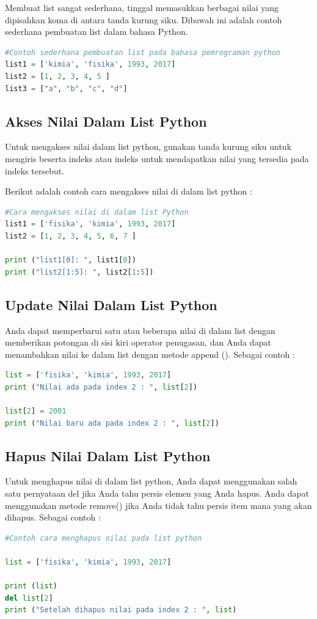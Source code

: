 Membuat list sangat sederhana, tinggal memasukkan berbagai nilai yang dipisahkan koma di antara tanda kurung siku. Dibawah ini adalah contoh sederhana pembuatan list dalam bahasa Python.
\begin{lstlisting}[language=Python]
#Contoh sederhana pembuatan list pada bahasa pemrograman python
list1 = ['kimia', 'fisika', 1993, 2017]
list2 = [1, 2, 3, 4, 5 ]
list3 = ["a", "b", "c", "d"]
\end{lstlisting}

\subsection{Akses Nilai Dalam List Python}
Untuk mengakses nilai dalam list python, gunakan tanda kurung siku untuk mengiris beserta indeks atau indeks untuk mendapatkan nilai yang tersedia pada indeks tersebut.

Berikut adalah contoh cara mengakses nilai di dalam list python :
\begin{lstlisting}[language=Python]
#Cara mengakses nilai di dalam list Python
list1 = ['fisika', 'kimia', 1993, 2017]
list2 = [1, 2, 3, 4, 5, 6, 7 ]

print ("list1[0]: ", list1[0])
print ("list2[1:5]: ", list2[1:5])
\end{lstlisting}

\subsection{Update Nilai Dalam List Python}
Anda dapat memperbarui satu atau beberapa nilai di dalam list dengan memberikan potongan di sisi kiri operator penugasan, dan Anda dapat menambahkan nilai ke dalam list dengan metode append (). Sebagai contoh :
\begin{lstlisting}[language=Python]
list = ['fisika', 'kimia', 1993, 2017]
print ("Nilai ada pada index 2 : ", list[2])

list[2] = 2001
print ("Nilai baru ada pada index 2 : ", list[2])
\end{lstlisting}

\subsection{Hapus Nilai Dalam List Python}
Untuk menghapus nilai di dalam list python, Anda dapat menggunakan salah satu pernyataan del jika Anda tahu persis elemen yang Anda hapus. Anda dapat menggunakan metode remove() jika Anda tidak tahu persis item mana yang akan dihapus. Sebagai contoh :
\begin{lstlisting}[language=Python]
#Contoh cara menghapus nilai pada list python

list = ['fisika', 'kimia', 1993, 2017]

print (list)
del list[2]
print ("Setelah dihapus nilai pada index 2 : ", list)
\end{lstlisting}

